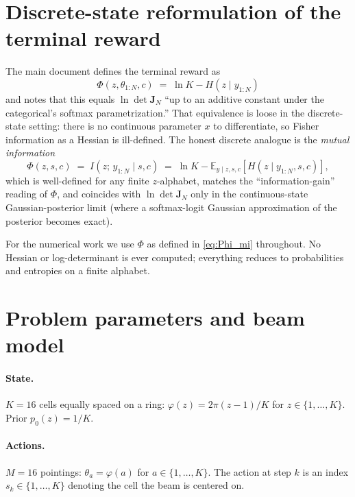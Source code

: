 \documentclass[11pt,a4paper]{article}
\newcommand{\E}{\mathbb{E}}
\begin{document}
\section{Discrete-state reformulation of the terminal reward}

The main document defines the terminal reward as
\[
  \Phi(z, \theta_{1:N}, c) \;=\; \ln K - H(z \mid y_{1:N})
\]
and notes that this equals $\ln\det \bm{J}_N$ ``up to an additive constant under the categorical's softmax parametrization.''  That equivalence is loose in the discrete-state setting: there is no continuous parameter $x$ to differentiate, so Fisher information as a Hessian is ill-defined.  The honest discrete analogue is the \emph{mutual information}
\begin{equation}
  \Phi(z, s, c) \;=\; I(z;\, y_{1:N} \mid s, c)
  \;=\; \ln K - \E_{y \mid z, s, c}[H(z \mid y_{1:N}, s, c)],
  \label{eq:Phi_mi}
\end{equation}
which is well-defined for any finite $z$-alphabet, matches the ``information-gain'' reading of $\Phi$, and coincides with $\ln\det \bm{J}_N$ only in the continuous-state Gaussian-posterior limit (where a softmax-logit Gaussian approximation of the posterior becomes exact).

For the numerical work we use $\Phi$ as defined in \eqref{eq:Phi_mi} throughout.  No Hessian or log-determinant is ever computed; everything reduces to probabilities and entropies on a finite alphabet.

\section{Problem parameters and beam model}

\paragraph{State.}  $K = 16$ cells equally spaced on a ring: $\varphi(z) = 2\pi(z - 1)/K$ for $z \in \{1, \ldots, K\}$.  Prior $p_0(z) = 1/K$.

\paragraph{Actions.}  $M = 16$ pointings: $\theta_a = \varphi(a)$ for $a \in \{1, \ldots, K\}$.  The action at step $k$ is an index $s_k \in \{1, \ldots, K\}$ denoting the cell the beam is centered on.
\end{document}
